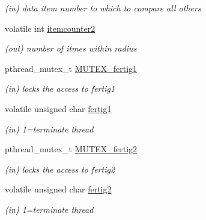 \begin{DoxyCompactItemize}
\begin{DoxyCompactList}\small\item\em (in) data item number to which to compare all others \end{DoxyCompactList}\item 
\mbox{\label{structdbscan__pt_a7282c5e97e591646a31c5762bf39bd3f}} 
volatile int \mbox{\hyperlink{structdbscan__pt_a7282c5e97e591646a31c5762bf39bd3f}{itemcounter2}}
\begin{DoxyCompactList}\small\item\em (out) number of itmes within radius \end{DoxyCompactList}\item 
\mbox{\label{structdbscan__pt_a9b4bcd3f61e899809341451edb698520}} 
pthread\+\_\+mutex\+\_\+t \mbox{\hyperlink{structdbscan__pt_a9b4bcd3f61e899809341451edb698520}{M\+U\+T\+E\+X\+\_\+fertig1}}
\begin{DoxyCompactList}\small\item\em (in) locks the access to fertig1 \end{DoxyCompactList}\item 
\mbox{\label{structdbscan__pt_a8ce1ed79a8f30b769dbae5a3725d0bec}} 
volatile unsigned char \mbox{\hyperlink{structdbscan__pt_a8ce1ed79a8f30b769dbae5a3725d0bec}{fertig1}}
\begin{DoxyCompactList}\small\item\em (in) 1=terminate thread \end{DoxyCompactList}\item 
\mbox{\label{structdbscan__pt_ade6e5b96f996f1d367a2595f7c237978}} 
pthread\+\_\+mutex\+\_\+t \mbox{\hyperlink{structdbscan__pt_ade6e5b96f996f1d367a2595f7c237978}{M\+U\+T\+E\+X\+\_\+fertig2}}
\begin{DoxyCompactList}\small\item\em (in) locks the access to fertig2 \end{DoxyCompactList}\item 
\mbox{\label{structdbscan__pt_a6e02721843281f1f83499d2e7c3ffd32}} 
volatile unsigned char \mbox{\hyperlink{structdbscan__pt_a6e02721843281f1f83499d2e7c3ffd32}{fertig2}}
\begin{DoxyCompactList}\small\item\em (in) 1=terminate thread \end{DoxyCompactList}\end{DoxyCompactItemize}


